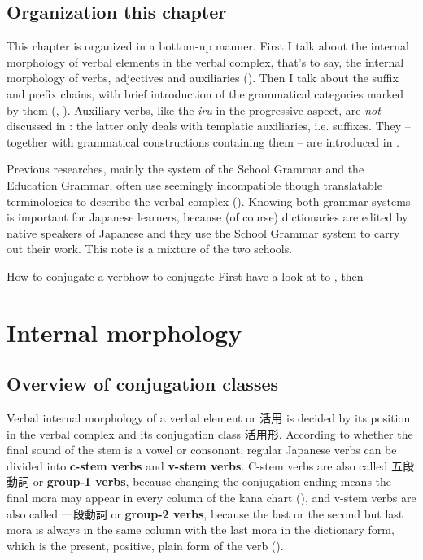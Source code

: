 \documentclass[UTF8, a4paper, oneside, scheme=plain]{ctexrep}
\newcommand*{\concept}[1]{\textbf{#1}}
\newcommand{\corpus}[1]{\emph{#1}}
\begin{document}
\subsection{Organization this chapter}

This chapter is organized in a bottom-up manner.
First I talk about the internal morphology of verbal elements in the verbal complex,
that's to say, the internal morphology of verbs, adjectives and auxiliaries 
().
Then I talk about the suffix and prefix chains,
with brief introduction of the grammatical categories marked by them
(, ).
Auxiliary verbs, like the \corpus{iru} in the progressive aspect,
are \emph{not} discussed in :
the latter only deals with templatic auxiliaries, i.e. suffixes.
They -- together with grammatical constructions containing them -- 
are introduced in .

Previous researches, mainly the system of the School Grammar and the Education Grammar,
often use seemingly incompatible though translatable terminologies 
to describe the verbal complex ().
Knowing both grammar systems is important for Japanese learners,
because (of course) dictionaries are edited by native speakers of Japanese
and they use the School Grammar system to carry out their work.
This note is a mixture of the two schools.

\begin{learnbox}{How to conjugate a verb}{how-to-conjugate}
    First have a look at  to ,
    then 
\end{learnbox}

\section{Internal morphology}\label{sec:conjugation-class}

\subsection{Overview of conjugation classes}\label{sec:conjugation-class-overview}

Verbal internal morphology of a verbal element or 活用 
is decided by its position in the verbal complex 
and its conjugation class 活用形.
According to whether the final sound of the stem is a vowel or consonant,
regular Japanese verbs can be divided into \concept{c-stem verbs} and \concept{v-stem verbs}.
C-stem verbs are also called 五段動詞 or \concept{group-1 verbs},
because changing the conjugation ending means 
the final mora may appear in every column of the kana chart (), 
and v-stem verbs are also called 一段動詞 or \concept{group-2 verbs},
because the last or the second but last mora is always in the same column 
with the last mora in the dictionary form,
which is the present, positive, plain form of the verb ().
\end{document}
